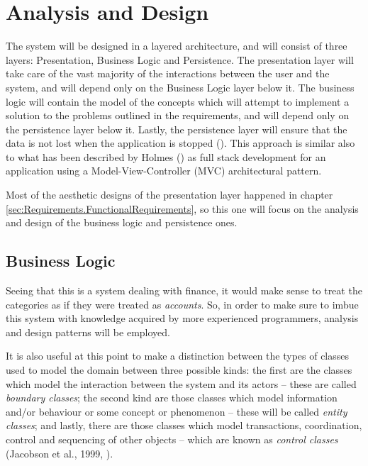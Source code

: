 \section{Analysis and Design} \label{sec:AnalysisAndDesign}

The system will be designed in a layered architecture, and will consist of
three layers: Presentation, Business Logic and Persistence. The presentation
layer will take care of the vast majority of the interactions between the user
and the system, and will depend only on the Business Logic layer below it. The
business logic will contain the model of the concepts which will attempt to
implement a solution to the problems outlined in the requirements, and will
depend only on the persistence layer below it. Lastly, the persistence layer
will ensure that the data is not lost when the application is stopped
(\cite[][p.~32-33]{bauer2016hibernate}). This approach is similar also to what
has been described by Holmes (\citeyear[][p.~3]{holmes2016mean}) as full stack
development for an application using a Model-View-Controller (MVC)
architectural pattern.

Most of the aesthetic designs of the presentation layer happened in chapter
\ref{sec:Requirements.FunctionalRequirements}, so this one will focus on the
analysis and design of the business logic and persistence ones.

\subsection{Business Logic} \label{sec:AnalysisAndDesign.BusinessLogic}
Seeing that this is a system dealing with finance, it would make sense to treat
the categories as if they were treated as \emph{accounts}. So, in order to
make sure to imbue this system with knowledge acquired by more experienced
programmers, analysis and design patterns will be employed.

It is also useful at this point to make a distinction between the types of
classes used to model the domain between three possible kinds: the first are
the classes which model the interaction between the system and its actors --
these are called \emph{boundary classes}; the second kind are those classes
which model information and/or behaviour or some concept or phenomenon -- these
will be called \emph{entity classes}; and lastly, there are those classes which
model transactions, coordination, control and sequencing of other objects --
which are known as \emph{control classes} (Jacobson et al., 1999,
\cite[cited][pp.~198-201]{bennett2010object}).
%


